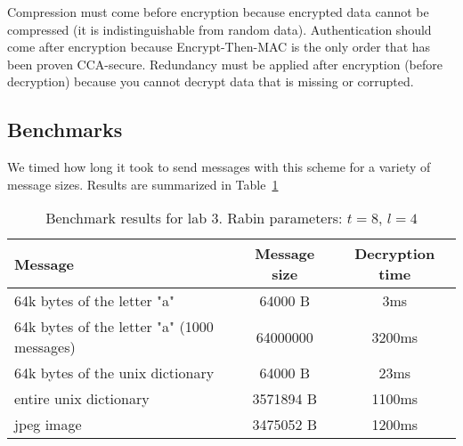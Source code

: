 \documentclass[10pt]{article}
\begin{document}
Compression must come before encryption because encrypted data cannot be compressed (it is indistinguishable from random data). Authentication should come after encryption because Encrypt-Then-MAC is the only order that has been proven CCA-secure. Redundancy must be applied after encryption (before decryption) because you cannot decrypt data that is missing or corrupted. 

\subsection{Benchmarks}

  We timed how long it took to send messages with this scheme for a variety of message sizes. Results are summarized in Table~\ref{tab:lab3}

\begin{table}
\centering
\begin{tabular}{lcc}
\hline
Message & Message size & Decryption time \\
\hline
64k bytes of the letter "a" & 64000 B & 3ms \\
64k bytes of the letter "a" (1000 messages) & 64000000 & 3200ms \\
64k bytes of the unix dictionary & 64000 B & 23ms \\
entire unix dictionary & 3571894 B & 1100ms \\
jpeg image & 3475052 B & 1200ms \\
\hline
\end{tabular}
\caption{Benchmark results for lab 3. Rabin parameters: $t=8$, $l=4$}
\label{tab:lab3}
\end{table}



{}
\end{document}
